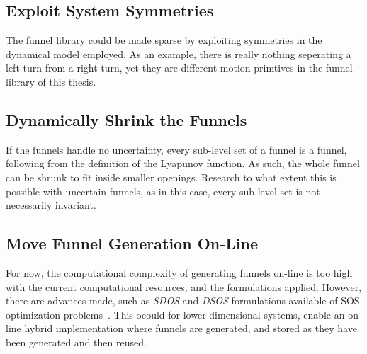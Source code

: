 \subsection{Exploit System Symmetries}

The funnel library could be made sparse by exploiting symmetries in the
dynamical model employed. As an example, there is really nothing seperating a
left turn from a right turn, yet they are different motion primtives in the
funnel library of this thesis.

\subsection{Dynamically Shrink the Funnels}

If the funnels handle no uncertainty, every sub-level set of a funnel is a
funnel, following from the definition of the Lyapunov function. As such, the whole funnel can be shrunk to fit inside smaller
openings. Research to what extent this is possible with uncertain funnels, as in
this case, every sub-level set is not necessarily invariant.

\subsection{Move Funnel Generation On-Line}

For now, the computational complexity of generating funnels on-line is too high
with the current computational resources, and the formulations applied. However,
there are advances made, such as \textit{SDOS} and \textit{DSOS} formulations
available of \ac{SOS} optimization problems~\cite{ahmadi2014dsos}. This ocould
for lower dimensional systems, enable an on-line hybrid implementation where
funnels are generated, and stored as they have been generated and then reused.




